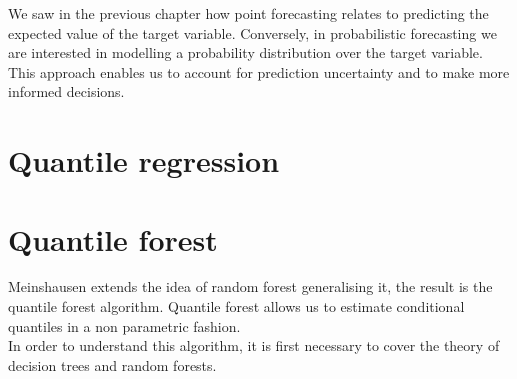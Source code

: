 We saw in the previous chapter how point forecasting relates to predicting the expected value of the target variable.
Conversely, in probabilistic forecasting we are interested in modelling a probability distribution over the target variable.
This approach enables us to account for prediction uncertainty and to make more informed decisions.
\section{Quantile regression}


\section{Quantile forest}
Meinshausen \cite{meinshausen2006quantile} extends the idea of random forest \cite{breiman2001random} generalising it, the result is the quantile forest algorithm. Quantile forest allows us to estimate conditional quantiles in a non parametric fashion.
\\
In order to understand this algorithm, it is first necessary to cover the theory of decision trees and random forests.
